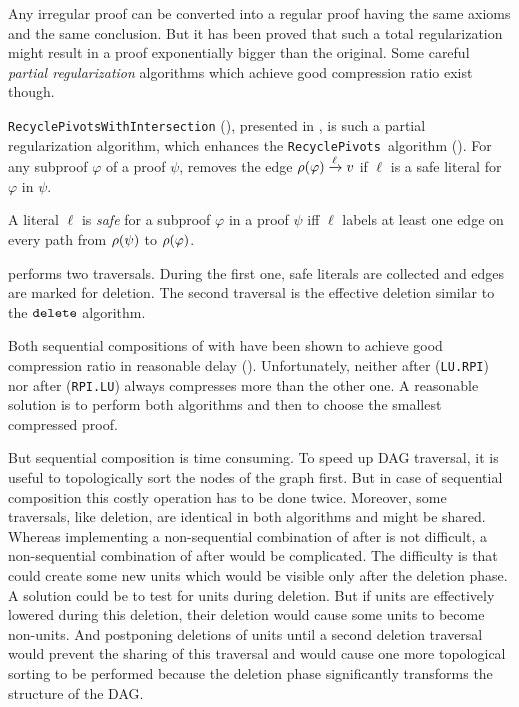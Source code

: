 \documentclass{llncs}
\begin{document}
Any irregular proof can be converted into a regular proof having the same axioms and the same
conclusion. But it has been proved \cite{Goerdt} that such a total regularization might result in a
proof exponentially bigger than the original. Some careful \emph{partial regularization} algorithms
which achieve good compression ratio exist though.

\texttt{RecyclePivotsWithIntersection} ({\RPI}), presented in \cite{LURPI}, is such a partial
regularization algorithm, which enhances the \texttt{RecyclePivots}~algorithm (\cite{RP08}).  For
any subproof $\varphi$ of a proof $\psi$, {\RPI} removes the edge $\rho(\varphi) \xrightarrow{\ell}
v$ if $\ell$ is a safe literal for $\varphi$ in $\psi$.

\begin{definition}
A literal $\ell$ is \emph{safe} for a subproof $\varphi$ in a proof $\psi$ iff $\ell$ labels at
least one edge on every path from $\rho(\psi)$ to $\rho(\varphi)$.
\end{definition}

{\RPI} performs two traversals. During the first one, safe literals are collected and edges are
marked for deletion. The second traversal is the effective deletion similar to the
$\FuncSty{delete}$ algorithm.

Both sequential compositions of {\LowerUnits} with {\RPI} have been shown to achieve good
compression ratio in reasonable delay (\cite{LURPI}). Unfortunately, neither {\LowerUnits} after
{\RPI} (\texttt{LU.RPI}) nor {\RPI} after {\LowerUnits} (\texttt{RPI.LU}) always compresses more than
the other one. A reasonable solution is to perform both algorithms and then to choose the smallest
compressed proof.

But sequential composition is time consuming. To speed up DAG traversal, it is useful to topologically
sort the nodes of the graph first. But in case of sequential composition this costly operation has to
be done twice. Moreover, some traversals, like deletion, are identical in both algorithms and might
be shared. Whereas implementing a non-sequential combination of {\RPI} after {\LowerUnits} is not
difficult, a non-sequential combination of {\LowerUnits} after {\RPI} would be complicated. The
difficulty is that {\RPI} could create some new units which would be visible only after the deletion
phase.  A solution could be to test for units during deletion. But if units are
effectively lowered during this deletion, their deletion would cause some units to become non-units.
And postponing deletions of units until a second deletion traversal would prevent the sharing of
this traversal and would cause one more topological sorting to be performed because the deletion phase
significantly transforms the structure of the DAG.
\end{document}
